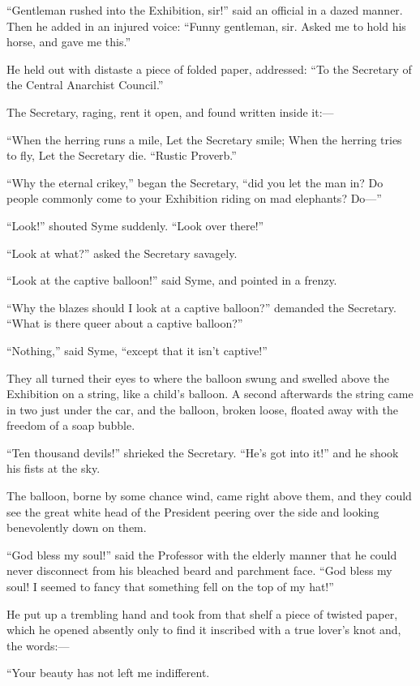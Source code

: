“Gentleman rushed into the Exhibition, sir!” said an official in a dazed manner. Then he added in an injured voice: “Funny gentleman, sir. Asked me to hold his horse, and gave me this.”

He held out with distaste a piece of folded paper, addressed: “To the Secretary of the Central Anarchist Council.”

The Secretary, raging, rent it open, and found written inside it:⁠—

    “When the herring runs a mile, Let the Secretary smile; When the herring tries to fly, Let the Secretary die.
    “Rustic Proverb.”

“Why the eternal crikey,” began the Secretary, “did you let the man in? Do people commonly come to your Exhibition riding on mad elephants? Do⁠—”

“Look!” shouted Syme suddenly. “Look over there!”

“Look at what?” asked the Secretary savagely.

“Look at the captive balloon!” said Syme, and pointed in a frenzy.

“Why the blazes should I look at a captive balloon?” demanded the Secretary. “What is there queer about a captive balloon?”

“Nothing,” said Syme, “except that it isn’t captive!”

They all turned their eyes to where the balloon swung and swelled above the Exhibition on a string, like a child’s balloon. A second afterwards the string came in two just under the car, and the balloon, broken loose, floated away with the freedom of a soap bubble.

“Ten thousand devils!” shrieked the Secretary. “He’s got into it!” and he shook his fists at the sky.

The balloon, borne by some chance wind, came right above them, and they could see the great white head of the President peering over the side and looking benevolently down on them.

“God bless my soul!” said the Professor with the elderly manner that he could never disconnect from his bleached beard and parchment face. “God bless my soul! I seemed to fancy that something fell on the top of my hat!”

He put up a trembling hand and took from that shelf a piece of twisted paper, which he opened absently only to find it inscribed with a true lover’s knot and, the words:⁠—

    “Your beauty has not left me indifferent.

